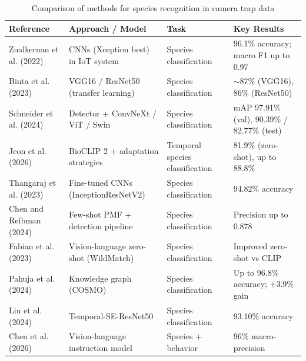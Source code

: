\begin{table}[ht]
\centering
\footnotesize
\caption{Comparison of methods for species recognition in camera trap data}
\label{tab:species_recognition}
\begin{tabular}{p{3cm} p{4.5cm} p{2.5cm} p{4cm}}
\hline
\textbf{Reference} & \textbf{Approach / Model} & \textbf{Task} & \textbf{Key Results} \\
\hline
Zualkernan et al. (2022) \cite{zualkernan2022iot} & CNNs (Xception best) in IoT system & Species classification & 96.1\% accuracy; macro F1 up to 0.97 \\
Binta et al. (2023) \cite{binta2023animal} & VGG16 / ResNet50 (transfer learning) & Species classification & $\sim$87\% (VGG16), 86\% (ResNet50) \\
Schneider et al. (2024) \cite{schneider2024recognition} & Detector + ConvNeXt / ViT / Swin & Species classification & mAP 97.91\% (val), 90.39\% / 82.77\% (test) \\
Jeon et al. (2026) \cite{jeon2026lessons} & BioCLIP 2 + adaptation strategies & Temporal species classification & 81.9\% (zero-shot), up to 88.8\% \\
Thangaraj et al. (2023) \cite{thangaraj2023automated} & Fine-tuned CNNs (InceptionResNetV2) & Species classification & 94.82\% accuracy \\
Chen and Reibman (2024) \cite{chen2024minimizing} & Few-shot PMF + detection pipeline & Species classification & Precision up to 0.878 \\
Fabian et al. (2023) \cite{fabian2023multimodal} & Vision-language zero-shot (WildMatch) & Species classification & Improved zero-shot vs CLIP \\
Pahuja et al. (2024) \cite{pahuja2024reviving} & Knowledge graph (COSMO) & Species classification & Up to 96.8\% accuracy; +3.9\% gain \\
Liu et al. (2024) \cite{liu2024improved} & Temporal-SE-ResNet50 & Species classification & 93.10\% accuracy \\
Chen et al. (2026) \cite{chen2026cameratrap} & Vision-language instruction model & Species + behavior & 96\% macro-precision \\
\hline
\end{tabular}
\end{table}

